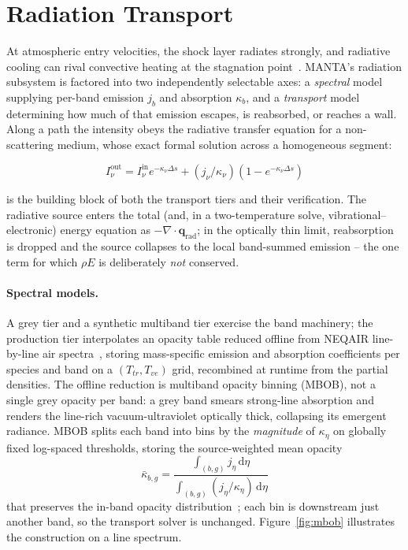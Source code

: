 \documentclass[journal,biblatex]{new-aiaa}
\newcommand{\divg}{\nabla\!\cdot\!}
\begin{document}
\section{Radiation Transport}
\label{sec:radiation}

At atmospheric entry velocities, the shock layer radiates strongly, and radiative cooling can rival convective heating at the stagnation point~\cite{johnston_nonequilibrium_2008}. MANTA's radiation subsystem is factored into two independently selectable axes: a \emph{spectral} model supplying per-band emission $j_b$ and absorption $\kappa_b$, and a \emph{transport} model determining how much of that emission escapes, is reabsorbed, or reaches a wall. Along a path the intensity obeys the radiative transfer equation for a non-scattering medium, whose exact formal solution across a homogeneous segment:

\begin{equation}
I_\nu^{\mathrm{out}}=I_\nu^{\mathrm{in}}e^{-\kappa_\nu\Delta s}+({j_\nu}/{\kappa_\nu})(1-e^{-\kappa_\nu\Delta s})
\end{equation}

is the building block of both the transport tiers and their verification. The radiative source enters the total (and, in a two-temperature solve, vibrational--electronic) energy equation as $-\divg\mathbf{q}_{\mathrm{rad}}$; in the optically thin limit, reabsorption is dropped and the source collapses to the local band-summed emission -- the one term for which $\rho E$ is deliberately \emph{not} conserved.

\paragraph{Spectral models.}
A grey tier and a synthetic multiband tier exercise the band machinery; the production tier interpolates an opacity table reduced offline from NEQAIR line-by-line air spectra~\cite{johnston_spectrum_2008,lopez_spark_2016}, storing mass-specific emission and absorption coefficients per species and band on a $(T_{tr},T_{ve})$ grid, recombined at runtime from the partial densities. The offline reduction is multiband opacity binning (MBOB), not a single grey opacity per band: a grey band smears strong-line absorption and renders the line-rich vacuum-ultraviolet optically thick, collapsing its emergent radiance. MBOB splits each band into bins by the \emph{magnitude} of $\kappa_\eta$ on globally fixed log-spaced thresholds, storing the source-weighted mean opacity
\begin{equation}
\bar\kappa_{b,g}=\frac{\int_{(b,g)} j_\eta\,\mathrm{d}\eta}{\int_{(b,g)}(j_\eta/\kappa_\eta)\,\mathrm{d}\eta}
\end{equation}
that preserves the in-band opacity distribution~\cite{hirata_improvement_2014}; each bin is downstream just another band, so the transport solver is unchanged. Figure~\ref{fig:mbob} illustrates the construction on a line spectrum.
\end{document}
